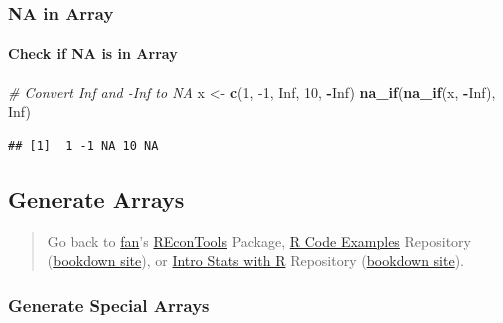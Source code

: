 \documentclass[
]{book}
\newenvironment{Shaded}{\begin{snugshade}}{\end{snugshade}}
\newcommand{\CommentTok}[1]{\textcolor[rgb]{0.56,0.35,0.01}{\textit{#1}}}
\newcommand{\DecValTok}[1]{\textcolor[rgb]{0.00,0.00,0.81}{#1}}
\newcommand{\KeywordTok}[1]{\textcolor[rgb]{0.13,0.29,0.53}{\textbf{#1}}}
\newcommand{\NormalTok}[1]{#1}
\newcommand{\OperatorTok}[1]{\textcolor[rgb]{0.81,0.36,0.00}{\textbf{#1}}}
\newcommand{\OtherTok}[1]{\textcolor[rgb]{0.56,0.35,0.01}{#1}}
\newcommand{\StringTok}[1]{\textcolor[rgb]{0.31,0.60,0.02}{#1}}
\begin{document}
\hypertarget{na-in-array}{%
\subsubsection{NA in Array}\label{na-in-array}}

\hypertarget{check-if-na-is-in-array}{%
\paragraph{Check if NA is in Array}\label{check-if-na-is-in-array}}

\begin{Shaded}
\begin{Highlighting}[]
\CommentTok{\# Convert Inf and {-}Inf to NA}
\NormalTok{x \textless{}{-}}\StringTok{ }\KeywordTok{c}\NormalTok{(}\DecValTok{1}\NormalTok{, }\DecValTok{{-}1}\NormalTok{, }\OtherTok{Inf}\NormalTok{, }\DecValTok{10}\NormalTok{, }\OperatorTok{{-}}\OtherTok{Inf}\NormalTok{)}
\KeywordTok{na\_if}\NormalTok{(}\KeywordTok{na\_if}\NormalTok{(x, }\OperatorTok{{-}}\OtherTok{Inf}\NormalTok{), }\OtherTok{Inf}\NormalTok{)}
\end{Highlighting}
\end{Shaded}

\begin{verbatim}
## [1]  1 -1 NA 10 NA
\end{verbatim}

\hypertarget{generate-arrays}{%
\subsection{Generate Arrays}\label{generate-arrays}}

\begin{quote}
Go back to \href{http://fanwangecon.github.io/}{fan}'s \href{https://fanwangecon.github.io/REconTools/}{REconTools} Package, \href{https://fanwangecon.github.io/R4Econ/}{R Code Examples} Repository (\href{https://fanwangecon.github.io/R4Econ/bookdown}{bookdown site}), or \href{https://fanwangecon.github.io/Stat4Econ/}{Intro Stats with R} Repository (\href{https://fanwangecon.github.io/Stat4Econ/bookdown}{bookdown site}).
\end{quote}

\hypertarget{generate-special-arrays}{%
\subsubsection{Generate Special Arrays}\label{generate-special-arrays}}
\end{document}
